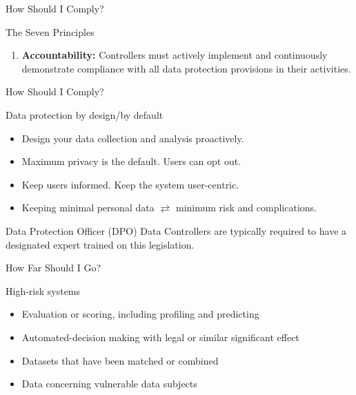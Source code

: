 \documentclass[24pt]{beamer}
\begin{document}
\begin{frame}{How Should I Comply?}
\begin{block}{The Seven Principles}
{\begin{enumerate}
					\item \textbf{Accountability:} Controllers must actively implement and continuously demonstrate compliance with all data protection provisions in their activities.
				\end{enumerate}
		}
	\end{block}
\end{frame}

\begin{frame}{How Should I Comply?}
	\begin{block}{Data protection by design/by default}
		\begin{itemize}
			\item Design your data collection and analysis \alert{proactively}.
			\item Maximum privacy is the default. Users can opt out.
			\item Keep users informed. Keep the system user-centric.
			\item Keeping \alert{minimal personal data} $\rightleftarrows$ minimum risk and complications.
		\end{itemize}
	\end{block}
	
	\begin{block}{Data Protection Officer (DPO)}
		Data Controllers are typically required to have a \alert{designated expert} trained on this legislation.
	\end{block}
\end{frame}

\begin{frame}{How Far Should I Go?}
	\begin{alertblock}{High-risk systems}
		\begin{itemize}
			\item Evaluation or scoring, including profiling and predicting
			\item Automated-decision making with legal or similar significant effect
			\item Datasets that have been matched or combined
			\item Data concerning vulnerable data subjects
		\end{itemize}
	\end{alertblock}
\end{frame}
\end{document}
